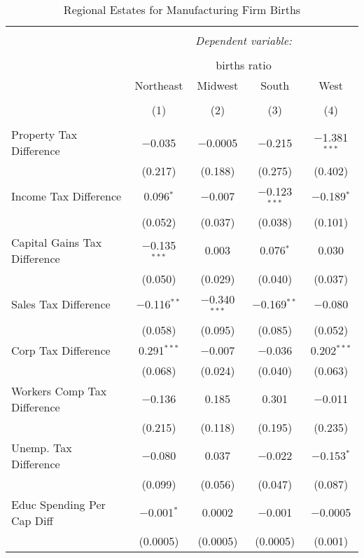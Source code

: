 
\begin{table}[!htbp] \centering 
  \caption{Regional Estates for  Manufacturing Firm Births} 
  \label{} 
\begin{tabular}{@{\extracolsep{5pt}}lcccc} 
\\[-1.8ex]\hline 
\hline \\[-1.8ex] 
 & \multicolumn{4}{c}{\textit{Dependent variable:}} \\ 
\cline{2-5} 
\\[-1.8ex] & \multicolumn{4}{c}{births ratio} \\ 
 & Northeast & Midwest & South & West \\ 
\\[-1.8ex] & (1) & (2) & (3) & (4)\\ 
\hline \\[-1.8ex] 
 Property Tax Difference & $-$0.035 & $-$0.0005 & $-$0.215 & $-$1.381$^{***}$ \\ 
  & (0.217) & (0.188) & (0.275) & (0.402) \\ 
  Income Tax Difference & 0.096$^{*}$ & $-$0.007 & $-$0.123$^{***}$ & $-$0.189$^{*}$ \\ 
  & (0.052) & (0.037) & (0.038) & (0.101) \\ 
  Capital Gains Tax Difference & $-$0.135$^{***}$ & 0.003 & 0.076$^{*}$ & 0.030 \\ 
  & (0.050) & (0.029) & (0.040) & (0.037) \\ 
  Sales Tax Difference & $-$0.116$^{**}$ & $-$0.340$^{***}$ & $-$0.169$^{**}$ & $-$0.080 \\ 
  & (0.058) & (0.095) & (0.085) & (0.052) \\ 
  Corp Tax Difference & 0.291$^{***}$ & $-$0.007 & $-$0.036 & 0.202$^{***}$ \\ 
  & (0.068) & (0.024) & (0.040) & (0.063) \\ 
  Workers Comp Tax Difference & $-$0.136 & 0.185 & 0.301 & $-$0.011 \\ 
  & (0.215) & (0.118) & (0.195) & (0.235) \\ 
  Unemp. Tax Difference & $-$0.080 & 0.037 & $-$0.022 & $-$0.153$^{*}$ \\ 
  & (0.099) & (0.056) & (0.047) & (0.087) \\ 
  Educ Spending Per Cap Diff & $-$0.001$^{*}$ & 0.0002 & $-$0.001 & $-$0.0005 \\ 
  & (0.0005) & (0.0005) & (0.0005) & (0.001) \\ 

\end{tabular}
\end{table}
